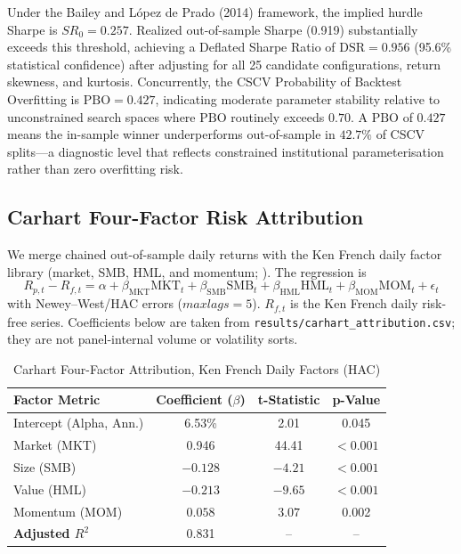 \documentclass[11pt,a4paper]{article}
\begin{document}
Under the Bailey and L\'opez de Prado (2014) framework, the implied hurdle Sharpe is $SR_0 = 0.257$. Realized out-of-sample Sharpe (0.919) substantially exceeds this threshold, achieving a Deflated Sharpe Ratio of $\text{DSR} = 0.956$ (95.6\% statistical confidence) after adjusting for all 25 candidate configurations, return skewness, and kurtosis. Concurrently, the CSCV Probability of Backtest Overfitting is $\text{PBO} = 0.427$, indicating moderate parameter stability relative to unconstrained search spaces where $\text{PBO}$ routinely exceeds $0.70$. A $\text{PBO}$ of $0.427$ means the in-sample winner underperforms out-of-sample in $42.7\%$ of CSCV splits---a diagnostic level that reflects constrained institutional parameterisation rather than zero overfitting risk.

\subsection{Carhart Four-Factor Risk Attribution}
\label{sec:carhart}
We merge chained out-of-sample daily returns with the Ken French daily factor library (market, SMB, HML, and momentum; \cite{carhart1997}). The regression is
\begin{equation} R_{p, t} - R_{f, t} = \alpha + \beta_{\text{MKT}} \text{MKT}_t + \beta_{\text{SMB}} \text{SMB}_t + \beta_{\text{HML}} \text{HML}_t + \beta_{\text{MOM}} \text{MOM}_t + \epsilon_{t} \end{equation}
with Newey--West/HAC errors ($maxlags=5$). $R_{f,t}$ is the Ken French daily risk-free series. Coefficients below are taken from \texttt{results/carhart\_attribution.csv}; they are not panel-internal volume or volatility sorts.

\begin{table}[htbp]
\centering
\caption{Carhart Four-Factor Attribution, Ken French Daily Factors (HAC)}
\label{tab:factor_reg}
\begin{tabular}{lccc}
\toprule
\textbf{Factor Metric} & \textbf{Coefficient ($\beta$)} & \textbf{t-Statistic} & \textbf{p-Value} \\
\midrule
Intercept (Alpha, Ann.) & 6.53\% & 2.01 & 0.045 \\
Market (MKT) & 0.946 & 44.41 & $<0.001$ \\
Size (SMB) & $-0.128$ & $-4.21$ & $<0.001$ \\
Value (HML) & $-0.213$ & $-9.65$ & $<0.001$ \\
Momentum (MOM) & $0.058$ & $3.07$ & 0.002 \\
\midrule
\textbf{Adjusted $R^2$} & 0.831 & -- & -- \\
\bottomrule
\end{tabular}
\end{table}
\end{document}
